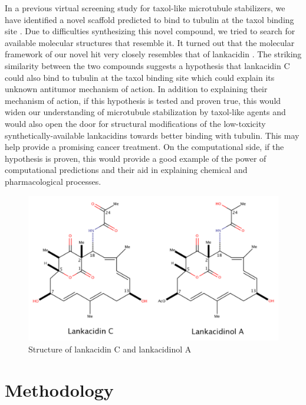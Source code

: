 \documentclass[11pt]{report}
\begin{document}
In a previous virtual screening
study for taxol-like microtubule stabilizers, we
have identified a novel scaffold predicted to bind 
to tubulin at the taxol binding site \cite{Ayoub2013}.
Due to difficulties synthesizing this novel 
compound, we tried to search for available molecular
structures that resemble it. It turned out that the
molecular framework of our novel
hit very closely resembles that of lankacidin \cite{Ayoub2013}.
The striking similarity between the two compounds
suggests a hypothesis that lankacidin C could 
also bind to tubulin at the taxol binding site
which could explain its unknown 
antitumor mechanism of action. 
In addition to explaining their mechanism of
action, if this hypothesis
is tested and proven true, this would widen our understanding
of microtubule stabilization by taxol-like agents and 
would also open the door for structural modifications of the low-toxicity synthetically-available lankacidins
towards better binding with tubulin. This may help provide
a promising cancer treatment. On the computational side,
if the hypothesis is proven, this would provide a good
example of the power of computational predictions 
and their aid in explaining chemical and pharmacological
processes.

\begin{figure}
\centering
\includegraphics[width=0.98\linewidth]{images/LankStruc.pdf}
\caption[Structure of lankacidin C and lankacidinol A]{Structure of lankacidin C and lankacidinol A}
\label{f:Lank-truc}
\end{figure}


\section{Methodology}
\end{document}
